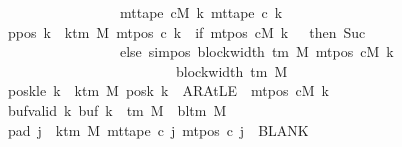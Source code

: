 \begin{isabellebody}
\ \ \ \ \ \ \ \ \ \ \ \ \ \ \ \ \ \ \ \ \ \ \ {\isacharparenleft}{\kern0pt}mt{\isacharunderscore}{\kern0pt}tape\ cM\ k{\isacharparenright}{\kern0pt}\ {\isacharparenleft}{\kern0pt}mt{\isacharunderscore}{\kern0pt}tape\ c{}\ k{\isacharparenright}{\kern0pt}{\isachardoublequoteclose}\isanewline
\ \ \ \ \ \ \ ppos{\isacharcolon}{\kern0pt}\ {\isachardoublequoteopen}{\isasymforall}k\ {\isacharless}{\kern0pt}\ k{\isacharunderscore}{\kern0pt}tm\ M{\isachardot}{\kern0pt}\ mt{\isacharunderscore}{\kern0pt}pos\ c{}\ k\ {\isacharequal}{\kern0pt}\ {\isacharparenleft}{\kern0pt}if\ mt{\isacharunderscore}{\kern0pt}pos\ cM\ k\ {\isacharequal}{\kern0pt}\ {}\ then\ Suc\ {}\isanewline
\ \ \ \ \ \ \ \ \ \ \ \ \ \ \ \ \ \ \ \ \ \ \ else\ sim{\isacharunderscore}{\kern0pt}pos\ {\isacharparenleft}{\kern0pt}block{\isacharunderscore}{\kern0pt}width\ {\isacharparenleft}{\kern0pt}{\isasymGamma}{\isacharunderscore}{\kern0pt}tm\ M{\isacharparenright}{\kern0pt}{\isacharparenright}{\kern0pt}\ {\isacharparenleft}{\kern0pt}mt{\isacharunderscore}{\kern0pt}pos\ cM\ k{\isacharparenright}{\kern0pt}\isanewline
\ \ \ \ \ \ \ \ \ \ \ \ \ \ \ \ \ \ \ \ \ \ \ \ \ \ \ \ \ \ {\isacharplus}{\kern0pt}\ block{\isacharunderscore}{\kern0pt}width\ {\isacharparenleft}{\kern0pt}{\isasymGamma}{\isacharunderscore}{\kern0pt}tm\ M{\isacharparenright}{\kern0pt}{\isacharparenright}{\kern0pt}{\isachardoublequoteclose}\isanewline
\ \ \ \ \ \ \ poskle{\isacharcolon}{\kern0pt}\ {\isachardoublequoteopen}{\isasymforall}k\ {\isacharless}{\kern0pt}\ k{\isacharunderscore}{\kern0pt}tm\ M{\isachardot}{\kern0pt}\ posk\ k\ {\isacharequal}{\kern0pt}\ AR{\isacharunderscore}{\kern0pt}AtLE\ {\isasymlongleftrightarrow}\ mt{\isacharunderscore}{\kern0pt}pos\ cM\ k\ {\isacharequal}{\kern0pt}\ {}{\isachardoublequoteclose}\isanewline
\ \ \ \ \ \ \ buf{\isacharunderscore}{\kern0pt}valid{\isacharcolon}{\kern0pt}\ {\isachardoublequoteopen}{\isasymforall}k{\isachardot}{\kern0pt}\ buf\ k\ {\isasymin}\ {\isasymGamma}{\isacharunderscore}{\kern0pt}tm\ M\ {\isasymunion}\ {\isacharbraceleft}{\kern0pt}bl{\isacharunderscore}{\kern0pt}tm\ M{\isacharbraceright}{\kern0pt}{\isachardoublequoteclose}\isanewline
\ \ \ \ \ \ \ pad{}{\isacharcolon}{\kern0pt}\ {\isachardoublequoteopen}{\isasymforall}j\ {\isasymge}\ k{\isacharunderscore}{\kern0pt}tm\ M{\isachardot}{\kern0pt}\ mt{\isacharunderscore}{\kern0pt}tape\ c{}\ j\ {\isacharparenleft}{\kern0pt}mt{\isacharunderscore}{\kern0pt}pos\ c{}\ j{\isacharparenright}{\kern0pt}\ {\isacharequal}{\kern0pt}\ BLANK{}{\isachardoublequoteclose}\isanewline

\end{isabellebody}
